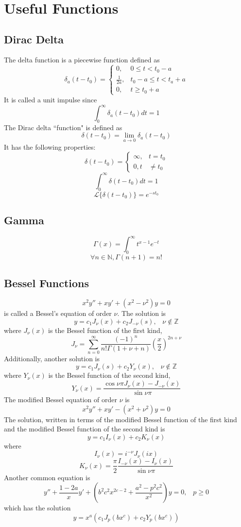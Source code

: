 \documentclass{article}
\begin{document}
\section{Useful Functions}
\subsection{Dirac Delta}
The delta function is a piecewise function defined as
$$\delta_a (t - t_0 ) = \begin{cases}
    0, & 0 \leq t < t_0 - a \\
    \frac{1}{2a}, & t_0 - a \leq t < t_a +a \\
    0, & t \geq t_0 + a
\end{cases}$$
It is called a unit impulse since
$$\int_0^\infty \delta_a(t - t_0 ) dt = 1$$
The Dirac delta ``function" is defined as
$$\delta ( t - t_0 ) = \lim_{a \to 0} \delta_a (t - t_0)$$
It has the following properties:
$$\delta(t - t_0 ) = \begin{cases}
    \infty , & t = t_0 \\
    0, t & \neq t_0
\end{cases}$$
$$\int_0^\infty \delta (t - t_0) dt = 1$$
$$\mathscr L \{ \delta(t - t_0) \} = e^{-st_0}$$
\subsection{Gamma}
$$\Gamma (x) = \int_0 ^\infty t^{x-1} e^{-t}$$
$$\forall n \in \mathbb N, \Gamma (n+1) = n!$$
\subsection{Bessel Functions}
$$x^2 y '' + xy' + (x^2 - \nu ^2 ) y = 0$$
is called a Bessel's equation of order $\nu$. The solution is 
$$y = c_1 J_\nu (x) + c_2 J_{- \nu } (s), \hspace{10pt} \nu \not\in \mathbb Z$$
where $J_{\nu} (x)$ is the Bessel function of the first kind, 
$$J_{\nu} = \sum_{n=0}^{\infty} \frac{(-1)^n}{n!\Gamma (1 + \nu + n)} \left(\frac{x}{2} \right)^{2n + \nu}$$
Additionally, another solution is 
$$y = c_1 J_\nu (s) + c_2 Y_\nu (x) , \hspace{10pt} \nu \not\in \mathbb Z$$
where $Y_\nu (x)$ is the Bessel function of the second kind, 
$$Y_\nu (x) = \frac{\cos \nu \pi J_\nu (x) - J_{-\nu} (x)}{\sin \nu \pi }$$
The modified Bessel equation of order $\nu$ is 
$$x^2 y '' + x y' - (x^2 + \nu ^2 ) y = 0$$
The solution, written in terms of the modified Bessel function of the first kind and the modified Bessel function of the second kind is 
$$y = c_1 I_\nu (x) + c_2 K_\nu (x)$$
where
$$I_\nu (x) = i^{-\nu} J_\nu (ix)$$
$$K_\nu (x) = \frac{\pi}{2} \frac{I_{-\nu} (x) - I_\nu (x)}{\sin \nu \pi}$$
Another common equation is 
$$y'' + \frac{1-2a}{x} y ' + \left(b^2 c^2 x^{2c -2} + \frac{a^2 - p^2 c^2}{x^2} \right)y = 0, \hspace{10pt} p \geq 0$$
which has the solution
$$y = x^a \left( c_1 J_p (bx^c ) + c_2 Y_p (bx^c) \right)$$
\end{document}
